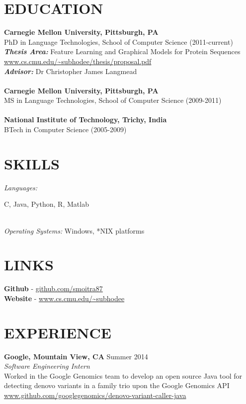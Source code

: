 \documentclass[margin]{res}
\begin{document}
\begin{resume}
 
\section{EDUCATION}\textbf{Carnegie Mellon University, Pittsburgh, PA} \\
					PhD in Language Technologies, School of Computer Science (2011-current) \\
					\textbf{	\textit{Thesis Area:}} Feature Learning and Graphical Models for Protein Sequences \\
					\url{www.cs.cmu.edu/~subhodee/thesis/proposal.pdf} \\
\textbf{	\textit{Advisor:}} Dr Christopher James Langmead \\
					\\					
  \textbf{Carnegie Mellon University, Pittsburgh, PA} \\
					MS in Language Technologies, School of Computer Science (2009-2011) \\
					\\					
 					\textbf{National Institute of Technology, Trichy, India} \\
					BTech in Computer Science (2005-2009) 		


\section{SKILLS} {\sl Languages:}  \parbox[position=center]{4.5in}{C, Java, Python, R, Matlab}\\
                {\sl Operating Systems:} Windows, *NIX platforms

\section{LINKS} \textbf{Github} - \url{github.com/smoitra87}\\
		  \textbf{Website} - \url{www.cs.cmu.edu/~subhodee}
  
\section{EXPERIENCE} 
                {\textbf{Google, Mountain View, CA } } \hfill Summer 2014 \\
                {\sl Software Engineering Intern } \\
		Worked in the Google Genomics team to develop an open source Java tool for detecting denovo variants in a family trio upon the Google Genomics API\\
			 \url{www.github.com/googlegenomics/denovo-variant-caller-java}


\end{resume}
\end{document}
